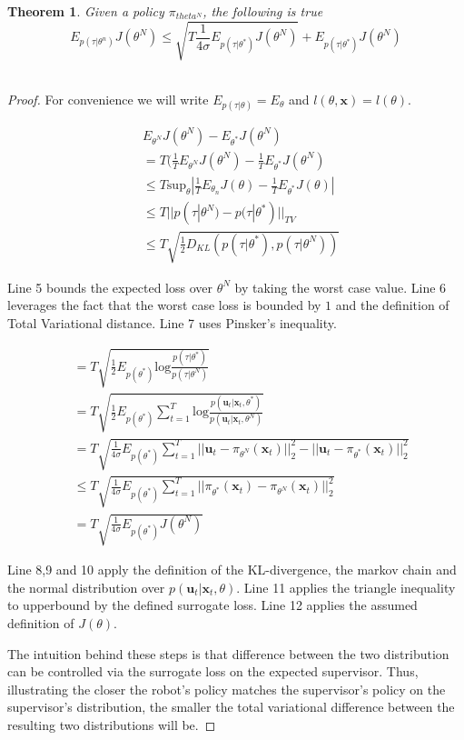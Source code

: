 \documentclass[10pt, conference]{ieeeconf}      %
\newtheorem{theorem}{Theorem}[section]
\newcommand{\bu}{\mathbf{u}}
\newcommand{\bx}{\mathbf{x}}
\begin{document}
\begin{theorem}
Given a policy $\pi_{theta^N}$, the following is true 
$$E_{p(\tau|\theta^n)} J(\theta^N) \leq \sqrt{T\frac{1}{4\sigma}E_{p(\tau|\theta^*)} J(\theta^N)}+E_{p(\tau|\theta^*)} J(\theta^N)$$\\
\end{theorem}
\begin{proof}
For convenience we will write $E_{p(\tau|\theta)} = E_{\theta}$ and $l(\theta,\bx) = l(\theta)$. 

\begin{align}
&E_{\theta^N} J(\theta^N) - E_{\theta^*} J(\theta^N) \\
&= T(\frac{1}{T}E_{\theta^N} J(\theta^N) -\frac{1}{T}E_{\theta^*} J(\theta^N)\\
&\leq  T\mbox{sup}_{\theta} |\frac{1}{T}E_{\theta_n}J(\theta) - \frac{1}{T}E_{\theta^*} J(\theta)|\\
&\leq  T| | p(\tau|\theta^N) - p(\tau|\theta^*)||_{TV}\\
&\leq T\sqrt{\frac{1}{2} D_{KL}(p(\tau|\theta^*),p(\tau|\theta^N))}
\end{align}

Line 5 bounds the expected loss over $\theta^N$ by taking the worst case value. Line 6 leverages the fact that the worst case loss is bounded by $1$ and the definition of Total Variational distance. Line 7 uses Pinsker's inequality. 


\begin{align}
&= T\sqrt{\frac{1}{2} E_{p(\theta^*)} \mbox{log} \frac{p(\tau|\theta^*)}{p(\tau|\theta^N)}}\\
&= T\sqrt{\frac{1}{2} E_{p(\theta^*)} \sum^T_{t=1}\mbox{log} \frac{p(\bu_t|\bx_t,\theta^*)}{p(\bu_t|\bx_t,\theta^N)}}\\
&= T\sqrt{\frac{1}{4\sigma} E_{p(\theta^*)} \sum^T_{t=1} ||\bu_t- \pi_{\theta^N}(\bx_t)||_2^2 - ||\bu_t- \pi_{\theta^*}(\bx_t)||_2^2}\\
&\leq T\sqrt{\frac{1}{4\sigma} E_{p(\theta^*)} \sum^T_{t=1}  ||\pi_{\theta^*}(\bx_t) - \pi_{\theta^N}(\bx_t)||_2^2}\\
&= T\sqrt{\frac{1}{4\sigma} E_{p(\theta^*)} J(\theta^N)}
\end{align}

Line 8,9 and 10 apply the definition of the KL-divergence, the markov chain and the normal distribution over $p(\bu_t|\bx_t,\theta)$. Line 11 applies the triangle inequality to upperbound by the defined surrogate loss. Line 12 applies the assumed definition of $J(\theta)$. 

The intuition behind these steps is that difference between  the two distribution can be controlled via the surrogate loss on the expected supervisor. Thus, illustrating the closer the robot's policy matches the supervisor's policy on the supervisor's distribution, the smaller the total variational difference between the resulting two distributions will be. 


\end{proof}
 
\end{document}
